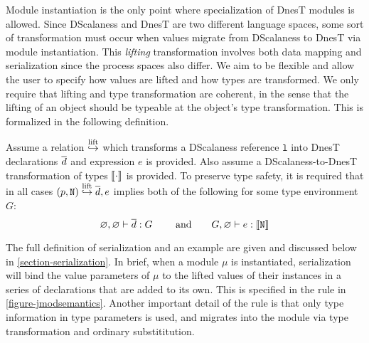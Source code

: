 Module instantiation is the only point where specialization of DnesT modules is allowed. Since
DScalaness and DnesT are two different language spaces, some sort of transformation must occur
when values migrate from DScalaness to DnesT via module instantiation. This \emph{lifting}
transformation involves both data mapping and serialization since the process spaces also
differ. We aim to be flexible and allow the user to specify how values are lifted and how types
are transformed. We only require that lifting and type transformation are coherent, in the sense
that the lifting of an object should be typeable at the object's type transformation. This is
formalized in the following definition.
\begin{definition}
\label{def-lifting}
Assume a relation $\overset{\text{lift}}{\hookrightarrow}$ which transforms a DScalaness reference $\texttt{l}$ into DnesT
declarations $\overline{d}$ and expression $e$ is provided. Also assume a DScalaness-to-DnesT
transformation of types $\llbracket \cdot \rrbracket$ is provided. To preserve type safety, it is required that
in all cases $\mathtt{(}p,\mathtt{N)} \overset{\text{lift}}{\hookrightarrow} \overline{d}, e$ implies both of the following for some type
environment $G$:
$$
\varnothing, \varnothing \vdash \overline{d} : G \qquad \text{ and} \qquad
 G, \varnothing \vdash e : \llbracket \texttt{N} \rrbracket 
$$
\end{definition}
The full definition of serialization and an example are given and discussed below in
\autoref{section-serialization}. In brief, when a module $\mu$ is instantiated, serialization
will bind the value parameters of $\mu$ to the lifted values of their instances in a series of
declarations that are added to its own. This is specified in the  rule in
\autoref{figure-jmodsemantics}. Another important detail of the  rule is that
only type information in type parameters is used, and migrates into the module via type
transformation and ordinary substititution.

\jmodsemanticsfig

